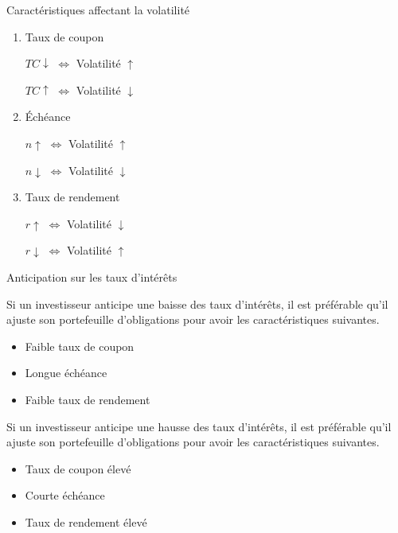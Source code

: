 \documentclass[11pt]{beamer}
\begin{document}
\begin{frame}{Caractéristiques affectant la volatilité}
\begin{enumerate}
\item Taux de coupon 
\begin{center}
$TC \downarrow$ \hspace{1cm} $\Longleftrightarrow$  \hspace{1cm} Volatilité $\uparrow$
\end{center}
\begin{center}
$TC \uparrow$ \hspace{1cm} $\Longleftrightarrow$  \hspace{1cm} Volatilité $\downarrow$
\end{center}
\item Échéance
\begin{center}
$n \uparrow$ \hspace{1cm} $\Longleftrightarrow$  \hspace{1cm} Volatilité $\uparrow$
\end{center}
\begin{center}
$n \downarrow$ \hspace{1cm} $\Longleftrightarrow$  \hspace{1cm} Volatilité $\downarrow$
\end{center}
\item Taux de rendement 
\begin{center}
$r \uparrow$ \hspace{1cm} $\Longleftrightarrow$  \hspace{1cm} Volatilité $\downarrow$
\end{center}
\begin{center}
$r \downarrow$ \hspace{1cm} $\Longleftrightarrow$  \hspace{1cm} Volatilité $\uparrow$
\end{center}
\end{enumerate}
\end{frame}

\begin{frame}{Anticipation sur les taux d'intérêts}

Si un investisseur anticipe une baisse des taux d'intérêts,  il est préférable qu'il ajuste son portefeuille d'obligations pour avoir les caractéristiques suivantes.
\begin{itemize}
\item Faible taux de coupon
\item Longue échéance 
\item Faible taux de rendement 
\end{itemize}
Si un investisseur anticipe une hausse des taux d'intérêts, il est préférable qu'il ajuste son portefeuille d'obligations pour avoir les caractéristiques suivantes.
\begin{itemize}
\item Taux de coupon élevé
\item Courte échéance 
\item Taux de rendement élevé
\end{itemize}
\end{frame}
\end{document}
